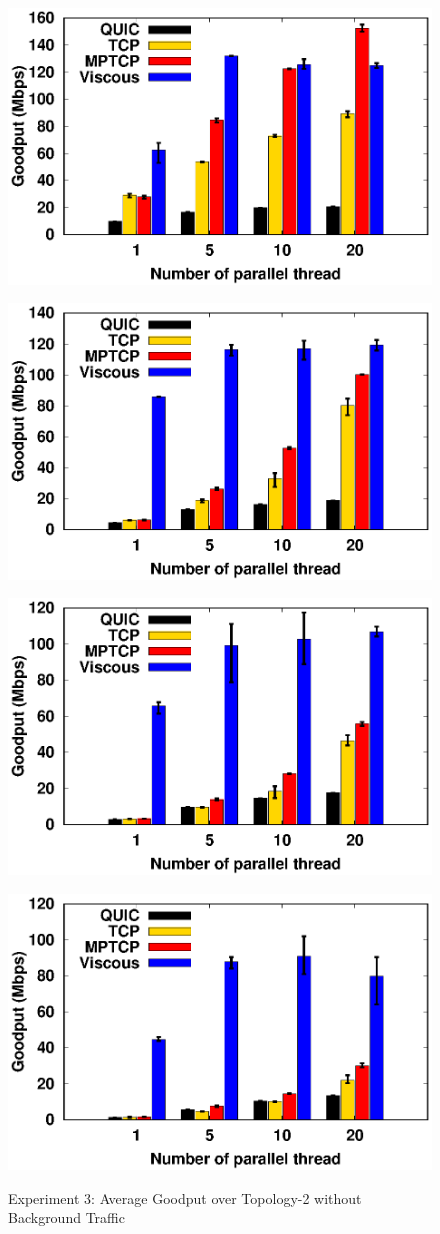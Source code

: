     \begin{figure}[!t]
        \begin{center}
            \begin{minipage}{0.45\linewidth}
                \centering
                \includegraphics[width=0.24\linewidth]{img/exp10/goodput_1}
                \label{fig:exp10_goodput_16}
            \end{minipage}
            \begin{minipage}{0.45\linewidth}
                \centering
                \includegraphics[width=0.24\linewidth]{img/exp10/goodput_5}
                \label{fig:exp10_goodput_80}
            \end{minipage}
            \begin{minipage}{0.45\linewidth}
                \centering
                \includegraphics[width=0.24\linewidth]{img/exp10/goodput_10}
                \label{fig:exp10_goodput_160}
            \end{minipage}
            \begin{minipage}{0.45\linewidth}
                \centering
                \includegraphics[width=0.24\linewidth]{img/exp10/goodput_20}
                \label{fig:exp10_goodput_320}
            \end{minipage}
            \caption{\label{fig:exp10_goodput}Experiment 3: Average Goodput over Topology-2 without Background Traffic}
        \end{center}
    \end{figure}


